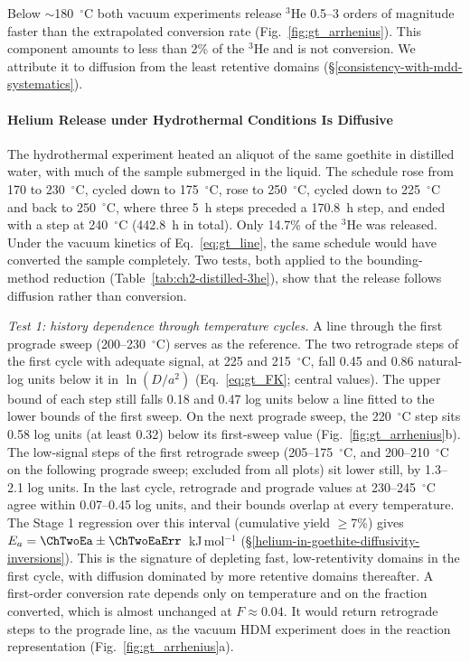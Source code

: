 Below $\sim$180~$^\circ$C both vacuum experiments release $^3$He 0.5--3 orders of magnitude
faster than the extrapolated conversion rate (Fig.~\ref{fig:gt_arrhenius}). This component amounts
to less than 2\% of the $^3$He and is not conversion. We attribute it to diffusion from the least
retentive domains (\S\ref{consistency-with-mdd-systematics}).

\paragraph{Helium Release under Hydrothermal Conditions Is Diffusive}\label{sec:gt_hydro}

The hydrothermal experiment heated an aliquot of the same goethite in distilled water, with
much of the sample submerged in the liquid. The schedule rose from 170 to 230~$^\circ$C, cycled
down to 175~$^\circ$C, rose to 250~$^\circ$C, cycled down to 225~$^\circ$C and back to 250~$^\circ$C,
where three 5~h steps preceded a 170.8~h step, and ended with a step at 240~$^\circ$C (442.8~h in
total). Only 14.7\% of the $^3$He was released. Under the vacuum kinetics of
Eq.~\eqref{eq:gt_line}, the same schedule would have converted the sample completely. Two tests,
both applied to the bounding-method reduction (Table~\ref{tab:ch2-distilled-3he}), show that the
release follows diffusion rather than conversion.

\textit{Test 1: history dependence through temperature cycles.} A line through the first
prograde sweep (200--230~$^\circ$C) serves as the reference. The two retrograde steps of the
first cycle with adequate signal, at 225 and 215~$^\circ$C, fall 0.45 and 0.86 natural-log units
below it in $\ln(D/a^2)$ (Eq.~\eqref{eq:gt_FK}; central values). The upper bound of each step
still falls 0.18 and 0.47 log units below a line fitted to the lower bounds of the first sweep.
On the next prograde sweep, the 220~$^\circ$C step sits 0.58 log units (at least 0.32) below its
first-sweep value (Fig.~\ref{fig:gt_arrhenius}b). The low-signal steps of the first
retrograde sweep (205--175~$^\circ$C, and 200--210~$^\circ$C on the following prograde sweep;
excluded from all plots) sit lower still, by 1.3--2.1 log units. In the last cycle, retrograde and
prograde values at 230--245~$^\circ$C agree within 0.07--0.45 log units, and their bounds
overlap at every temperature. The Stage 1 regression over this interval (cumulative yield
$\geq$7\%) gives $E_a = \ChTwoEa\pm\ChTwoEaErr$~kJ\,mol$^{-1}$
(\S\ref{helium-in-goethite-diffusivity-inversions}). This is the signature of depleting fast,
low-retentivity domains in the first cycle, with diffusion dominated by more retentive domains
thereafter. A first-order conversion rate depends only on temperature and on the fraction
converted, which is almost unchanged at $F\approx0.04$. It would return retrograde steps to the
prograde line, as the vacuum HDM experiment does in the reaction representation
(Fig.~\ref{fig:gt_arrhenius}a).

